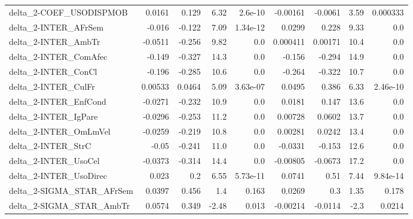 \begin{tabular}{lrrrrrrrr}
delta\_2-COEF\_USODISPMOB                &      0.0161 &        0.129 &     6.32 &  2.6e-10 &   -0.00161 &     -0.0061 &         3.59 &      0.000333 \\
delta\_2-INTER\_AFrSem                   &      -0.016 &       -0.122 &     7.09 & 1.34e-12 &     0.0299 &       0.228 &         9.33 &           0.0 \\
delta\_2-INTER\_AmbTr                    &     -0.0511 &       -0.256 &     9.82 &      0.0 &   0.000411 &     0.00171 &         10.4 &           0.0 \\
delta\_2-INTER\_ComAfec                  &      -0.149 &       -0.327 &     14.3 &      0.0 &     -0.156 &      -0.294 &         14.9 &           0.0 \\
delta\_2-INTER\_ConCl                    &      -0.196 &       -0.285 &     10.6 &      0.0 &     -0.264 &      -0.322 &         10.7 &           0.0 \\
delta\_2-INTER\_CulFr                    &     0.00533 &       0.0464 &     5.09 & 3.63e-07 &     0.0495 &       0.386 &         6.33 &      2.46e-10 \\
delta\_2-INTER\_EnfCond                  &     -0.0271 &       -0.232 &     10.9 &      0.0 &     0.0181 &       0.147 &         13.6 &           0.0 \\
delta\_2-INTER\_IgPare                   &     -0.0296 &       -0.253 &     11.2 &      0.0 &    0.00728 &      0.0602 &         13.7 &           0.0 \\
delta\_2-INTER\_OmLmVel                  &     -0.0259 &       -0.219 &     10.8 &      0.0 &    0.00281 &      0.0242 &         13.4 &           0.0 \\
delta\_2-INTER\_StrC                     &       -0.05 &       -0.241 &     11.0 &      0.0 &    -0.0331 &      -0.153 &         12.6 &           0.0 \\
delta\_2-INTER\_UsoCel                   &     -0.0373 &       -0.314 &     14.4 &      0.0 &   -0.00805 &     -0.0673 &         17.2 &           0.0 \\
delta\_2-INTER\_UsoDirec                 &       0.023 &          0.2 &     6.55 & 5.73e-11 &     0.0741 &        0.51 &         7.44 &      9.84e-14 \\
delta\_2-SIGMA\_STAR\_AFrSem              &      0.0397 &        0.456 &      1.4 &    0.163 &     0.0269 &         0.3 &         1.35 &         0.178 \\
delta\_2-SIGMA\_STAR\_AmbTr               &      0.0574 &        0.349 &    -2.48 &    0.013 &   -0.00214 &     -0.0114 &         -2.3 &        0.0214 \\

\end{tabular}
